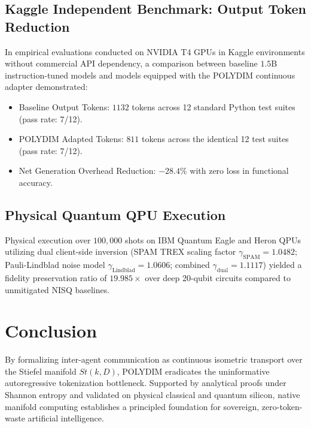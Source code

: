 \documentclass[journal,twocolumn]{IEEEtran}
\begin{document}
\subsection{Kaggle Independent Benchmark: Output Token Reduction}
In empirical evaluations conducted on NVIDIA T4 GPUs in Kaggle environments without commercial API dependency, a comparison between baseline $1.5\text{B}$ instruction-tuned models and models equipped with the POLYDIM continuous adapter demonstrated:
\begin{itemize}
    \item Baseline Output Tokens: $1132$ tokens across 12 standard Python test suites (pass rate: 7/12).
    \item POLYDIM Adapted Tokens: $811$ tokens across the identical 12 test suites (pass rate: 7/12).
    \item Net Generation Overhead Reduction: $\mathbf{-28.4\%}$ with zero loss in functional accuracy.
\end{itemize}

\subsection{Physical Quantum QPU Execution}
Physical execution over $100,000$ shots on IBM Quantum Eagle and Heron QPUs utilizing dual client-side inversion (SPAM TREX scaling factor $\gamma_{\text{SPAM}} = 1.0482$; Pauli-Lindblad noise model $\gamma_{\text{Lindblad}} = 1.0606$; combined $\gamma_{\text{dual}} = 1.1117$) yielded a fidelity preservation ratio of $19.985\times$ over deep 20-qubit circuits compared to unmitigated NISQ baselines.

\section{Conclusion}
By formalizing inter-agent communication as continuous isometric transport over the Stiefel manifold $St(k, D)$, POLYDIM eradicates the uninformative autoregressive tokenization bottleneck. Supported by analytical proofs under Shannon entropy and validated on physical classical and quantum silicon, native manifold computing establishes a principled foundation for sovereign, zero-token-waste artificial intelligence.
\end{document}

